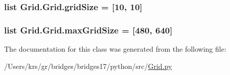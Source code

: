 \subsubsection[{grid\+Size}]{\setlength{\rightskip}{0pt plus 5cm}list Grid.\+Grid.\+grid\+Size = \mbox{[}10, 10\mbox{]}\hspace{0.3cm}{\ttfamily [static]}}\label{class_grid_1_1_grid_a0e53d7466c48b288fb28deef2b870742}
\hypertarget{class_grid_1_1_grid_a4299841d081e91e31c4c86dc38bb7829}{}
\subsubsection[{max\+Grid\+Size}]{\setlength{\rightskip}{0pt plus 5cm}list Grid.\+Grid.\+max\+Grid\+Size = \mbox{[}480, 640\mbox{]}\hspace{0.3cm}{\ttfamily [static]}}\label{class_grid_1_1_grid_a4299841d081e91e31c4c86dc38bb7829}


The documentation for this class was generated from the following file\+:\begin{DoxyCompactItemize}
\item 
/\+Users/krs/gr/bridges/bridges17/python/src/\hyperlink{_grid_8py}{Grid.\+py}\end{DoxyCompactItemize}
